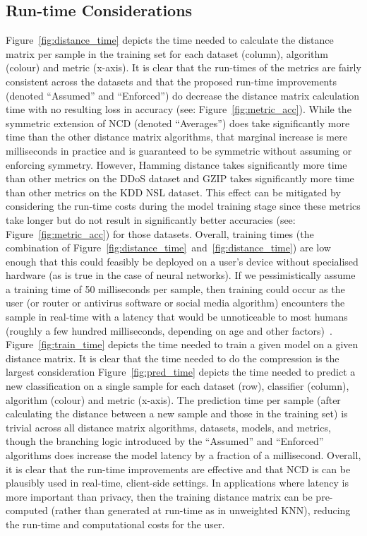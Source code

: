 \documentclass[conference]{IEEEtran}
\begin{document}
\subsection{Run-time Considerations}

Figure~\ref{fig:distance_time} depicts the time needed to calculate the distance matrix per sample in the training set for each dataset (column), algorithm (colour) and metric (x-axis). 
It is clear that the run-times of the metrics are fairly consistent across the datasets and that the proposed run-time improvements (denoted ``Assumed'' and ``Enforced'') do decrease the distance matrix calculation time with no resulting loss in accuracy (see: Figure~\ref{fig:metric_acc}). 
While the symmetric extension of NCD (denoted ``Averages'') does take significantly more time than the other distance matrix algorithms, that marginal increase is mere milliseconds in practice and is guaranteed to be symmetric without assuming or enforcing symmetry. 
However, Hamming distance takes significantly more time than other metrics on the DDoS dataset and GZIP takes significantly more time than other metrics on the KDD NSL dataset. 
This effect can be mitigated by considering the run-time costs during the model training stage since these metrics take longer but do not result in significantly better accuracies (see: Figure~\ref{fig:metric_acc}) for those datasets. 
Overall, training times (the combination of Figure~\ref{fig:distance_time}~and~\ref{fig:distance_time}) are low enough that this could feasibly be deployed on a user's device without specialised hardware (as is true in the case of neural networks). 
If we pessimistically assume a training time of 50 milliseconds per sample, then training could occur as the user (or router or antivirus software or social media algorithm) encounters the sample in real-time with a latency that would be unnoticeable to most humans (roughly a few hundred milliseconds, depending on age and other factors)~\cite{reaction_time}. 
Figure~\ref{fig:train_time} depicts the time needed to train a given model on a given distance matrix. 
It is clear that the time needed to do the compression is the largest consideration
Figure~\ref{fig:pred_time} depicts the time needed to predict a new classification on a single sample for each dataset (row), classifier (column), algorithm (colour) and metric (x-axis). 
The prediction time per sample (after calculating the distance between a new sample and those in the training set) is trivial across all distance matrix algorithms, datasets, models, and metrics, though the branching logic introduced by the ``Assumed'' and ``Enforced'' algorithms does increase the model latency by a fraction of a millisecond.
Overall, it is clear that the run-time improvements are effective and that NCD is can be plausibly used in real-time, client-side settings. 
In applications where latency is more important than privacy, then the training distance matrix can be pre-computed (rather than generated at run-time as in unweighted KNN), reducing the run-time and computational costs for the user. 
\end{document}
